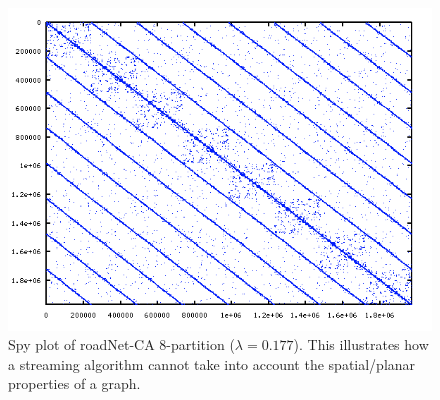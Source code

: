 \documentclass[11pt]{article}
\begin{document}
\begin{figure}[ht]
\centering
\includegraphics[scale=.60] {figures/roadNet-CA8.png}
\caption[Caption for]{Spy plot of roadNet-CA 8-partition ($\lambda=0.177$). This illustrates how a streaming algorithm cannot take into account the spatial/planar properties of a graph.}
\label{fig:4}
\end{figure}
\end{document}
